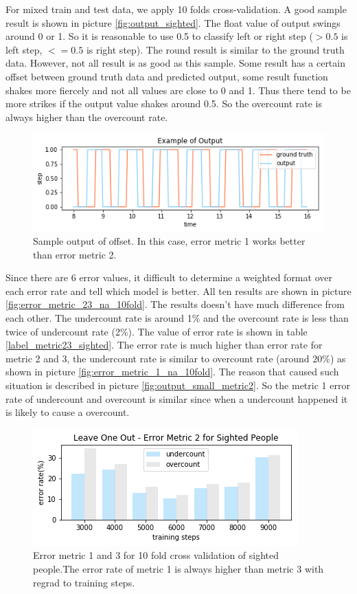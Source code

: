 \documentclass[11pt]{article}
\begin{document}
{For mixed train and test data, we apply 10 folds cross-validation. A good sample result is shown in picture \ref{fig:output_sighted}. The float value of output swings around 0 or 1. So it is reasonable to use 0.5 to classify left or right step ($>0.5$ is left step, $<=0.5$ is right step). The round result is similar to the ground truth data. However, not all result is as good as this sample. Some result has a certain offset between ground truth data and predicted output, some result function shakes more fiercely and not all values are close to 0 and 1. Thus there tend to be more strikes if the output value shakes around 0.5. So the overcount rate is always higher than the overcount rate.

\begin{figure}[ht]
\centering
\includegraphics[scale=0.4]{output_ex_offset}
\caption{Sample output of offset. In this case, error metric 1 works better than error metric 2.}
\label{fig:output_ex_offset}
\end{figure}


Since there are 6 error values, it difficult to determine a weighted format over each error rate and tell which model is better. All ten results are shown in picture \ref{fig:error_metric_23_na_10fold}. The results doesn't have much difference from each other. The undercount rate is around 1\% and the overcount rate is less than twice of undercount rate (2\%). The value of error rate is shown in table \ref{label_metric23_sighted}. The error rate is much higher than error rate for metric 2 and 3, the undercount rate is similar to overcount rate (around 20\%) as shown in picture \ref{fig:error_metric_1_na_10fold}. The reason that caused such situation is described in picture \ref{fig:output_small_metric2}. So the metric 1 error rate of undercount and overcount is similar since when a undercount happened it is likely to cause a overcount.

\begin{figure}[ht]
\centering
\includegraphics[scale=0.55]{error_metric_2_na_step}
\caption{Error metric 1 and 3 for 10 fold cross validation of sighted people.The error rate of metric 1 is always higher than metric 3 with regrad to training steps.}
\label{fig:error_metric_2_na_step}
\end{figure}


}
\end{document}

